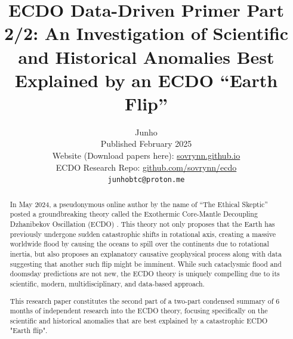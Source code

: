 \documentclass[10pt,twocolumn,letterpaper]{article}
\begin{document}
\title{ECDO Data-Driven Primer Part 2/2: An Investigation of Scientific and Historical Anomalies Best Explained by an ECDO “Earth Flip”}

\author{Junho\\
Published February 2025\\
Website (Download papers here): \href{https://sovrynn.github.io}{sovrynn.github.io}\\
ECDO Research Repo: \href{https://github.com/sovrynn/ecdo}{github.com/sovrynn/ecdo}\\
{\tt\small junhobtc@proton.me}
}

\maketitle

\begin{abstract}
In May 2024, a pseudonymous online author by the name of “The Ethical Skeptic” \cite{0} posted a groundbreaking theory called the Exothermic Core-Mantle Decoupling Dzhanibekov Oscillation (ECDO) \cite{1}. This theory not only proposes that the Earth has previously undergone sudden catastrophic shifts in rotational axis, creating a massive worldwide flood by causing the oceans to spill over the continents due to rotational inertia, but also proposes an explanatory causative geophysical process along with data suggesting that another such flip might be imminent. While such cataclysmic flood and doomsday predictions are not new, the ECDO theory is uniquely compelling due to its scientific, modern, multidisciplinary, and data-based approach.

This research paper constitutes the second part of a two-part condensed summary of 6 months of independent research \cite{2,20} into the ECDO theory, focusing specifically on the scientific and historical anomalies that are best explained by a catastrophic ECDO "Earth flip".

\end{abstract}
\end{document}
